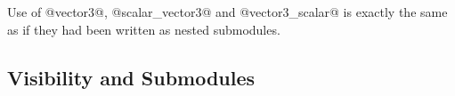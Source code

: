 Use of @vector3@, @scalar_vector3@ and @vector3_scalar@ is exactly the
same as if they had been written as nested submodules.


\subsection{Visibility and Submodules}





